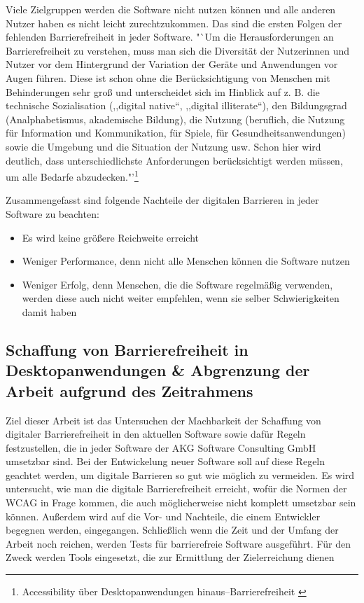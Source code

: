 Viele Zielgruppen werden die Software nicht nutzen können und alle anderen Nutzer haben es nicht leicht zurechtzukommen. Das sind die ersten Folgen der fehlenden Barrierefreiheit in jeder Software. "`Um die Herausforderungen an Barrierefreiheit zu verstehen, muss man sich die Diversität der Nutzerinnen und Nutzer vor dem Hintergrund der Variation der Geräte und Anwendungen vor Augen führen. Diese ist schon ohne die Berücksichtigung von Menschen mit Behinderungen sehr groß und unterscheidet sich im Hinblick auf z. B. die technische Sozialisation (,,digital native“, ,,digital illiterate“), den Bildungsgrad (Analphabetismus, akademische Bildung), die Nutzung (beruflich, die Nutzung für Information und Kommunikation, für Spiele, für Gesundheitsanwendungen) sowie die Umgebung und die Situation der Nutzung usw. Schon hier wird deutlich, dass unterschiedlichste Anforderungen berücksichtigt werden müssen, um alle Bedarfe abzudecken."'\footnote{Accessibility über Desktopanwendungen hinaus–Barrierefreiheit \cite{buhler2017accessibility}}

Zusammengefasst sind folgende Nachteile der digitalen Barrieren in jeder Software zu beachten:
\vspace{1em}

\begin{itemize}
	\item Es wird keine größere Reichweite erreicht
	\item Weniger Performance, denn nicht alle Menschen können die Software nutzen
	\item Weniger Erfolg, denn Menschen, die die Software regelmäßig verwenden, werden diese auch nicht weiter empfehlen, wenn sie selber Schwierigkeiten damit haben
\end{itemize}



\subsection{Schaffung von Barrierefreiheit in Desktopanwendungen \& Abgrenzung der Arbeit aufgrund des Zeitrahmens}
Ziel dieser Arbeit ist das Untersuchen der Machbarkeit der Schaffung von digitaler Barrierefreiheit in den aktuellen Software sowie dafür Regeln festzustellen, die in jeder Software der AKG Software Consulting GmbH umsetzbar sind. Bei der Entwickelung neuer Software soll auf diese Regeln geachtet werden, um digitale Barrieren so gut wie möglich zu vermeiden. Es wird untersucht, wie man die digitale Barrierefreiheit erreicht, wofür die Normen der \ac{WCAG} in Frage kommen, die auch möglicherweise nicht komplett umsetzbar sein können. Außerdem wird auf die Vor- und Nachteile, die einem Entwickler begegnen werden, eingegangen. Schließlich wenn die Zeit und der Umfang der Arbeit noch reichen, werden Tests für barrierefreie Software ausgeführt. Für den Zweck werden Tools eingesetzt, die zur Ermittlung der Zielerreichung dienen

